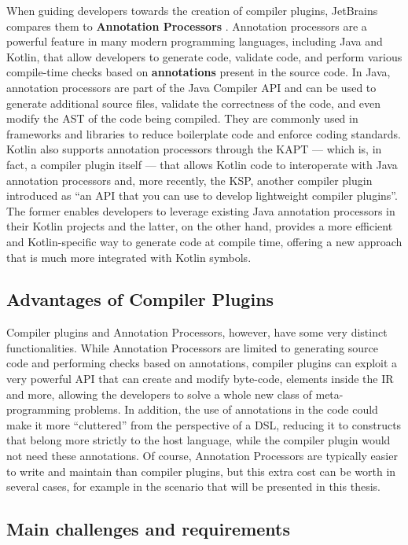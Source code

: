 \documentclass[12pt,a4paper,openright,twoside]{book}
\begin{document}
When guiding developers towards the creation of compiler plugins, JetBrains
compares them to \textbf{Annotation Processors}
\cite{JetBrains:KotlinCompilerPlugin}. Annotation processors are a powerful
feature in many modern programming languages, including Java and Kotlin, that
allow developers to generate code, validate code, and perform various
compile-time checks based on \textbf{annotations} present in the source code.
%
In Java, annotation processors are part of the Java Compiler API and can be used
to generate additional source files, validate the correctness of the code, and
even modify the \ac{AST} of the code being compiled. They are
commonly used in frameworks and libraries to reduce boilerplate code and enforce
coding standards.
%
Kotlin also supports annotation processors through the \ac{KAPT} --- which is, in
fact, a compiler plugin itself --- that allows Kotlin code to interoperate with
Java annotation processors and, more recently, the \ac{KSP}, another compiler
plugin introduced as ``an API that you can use to develop lightweight compiler
plugins''. The former enables developers to leverage existing Java annotation
processors in their Kotlin projects and the latter, on the other hand, provides
a more efficient and Kotlin-specific way to generate code at compile time,
offering a new approach that is much more integrated with Kotlin symbols.

\subsection{Advantages of Compiler Plugins}

Compiler plugins and Annotation Processors, however, have some very distinct
functionalities. While Annotation Processors are limited to generating source
code and performing checks based on annotations, compiler plugins can exploit a
very powerful API that can create and modify byte-code, elements inside the
\ac{IR} and more, allowing the developers to solve a whole new class of
meta-programming problems. In addition, the use of annotations in the code could
make it more ``cluttered'' from the perspective of a DSL, reducing it to
constructs that belong more strictly to the host language, while the compiler
plugin would not need these annotations. Of course, Annotation Processors are
typically easier to write and maintain than compiler plugins, but this extra
cost can be worth in several cases, for example in the scenario that will be
presented in this thesis.

\subsection{Main challenges and requirements}
\end{document}
